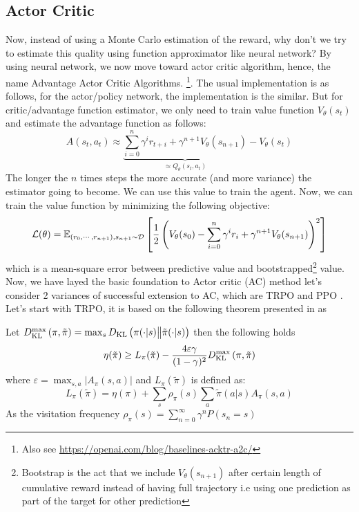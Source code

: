 \subsection{Actor Critic}
\label{sec:chap2-ator-critic}
Now, instead of using a Monte Carlo estimation of the reward, why don't we try to estimate this quality using function approximator like neural network? By using neural network, we now move toward actor critic algorithm, hence, the name Advantage Actor Critic Algorithms. \cite{mnih2016asynchronous}\footnote{Also see  \url{https://openai.com/blog/baselines-acktr-a2c/}}. The usual implementation is as follows, for the actor/policy network, the implementation is the similar. But for critic/advantage function estimator, we only need to train value function $V_\theta(s_t)$  and estimate the advantage function as follows:
\begin{equation}
    A(s_t, a_t) \approx \underbrace{\sum^n_{i=0} \gamma^i r_{t + i} + \gamma^{n+1} V_\theta(s_{n+1})}_{\approx Q_\theta(s_t, a_t)} - V_\theta(s_t)
\end{equation}
The longer the $n$ times steps the more accurate (and more variance) the estimator going to become. We can use this value to train the agent. Now, we can train the value function by minimizing the following objective:
\begin{equation}
\label{eqn:chap2-ac-critic-loss}
    \mathcal{L}(\theta) = \mathbb{E}_{(r_0, \cdots, r_{n+1}), s_{n+1} \sim \mathcal{D}}\left[ \frac{1}{2}\left( V_\theta(s_0) - \sum^n_{i=0} \gamma^i r_i + \gamma^{n+1}V_\theta(s_{n+1}) \right)^2 \right]
\end{equation}
which is a mean-square error between predictive value and bootstrapped\footnote{Bootstrap is the act that we include $V_\theta(s_{n+1})$ after certain length of cumulative reward instead of having full trajectory i.e using one prediction as part of the target for other prediction} value. Now, we have layed the basic foundation to Actor critic (AC) method let's consider 2 variances of successful extension to AC, which are TRPO \cite{schulman2015trust} and PPO \cite{schulman2017proximal}. Let's start with TRPO, it is based on the following theorem presented in \cite{schulman2015trust} as 
\begin{theorem}
Let $D_{\mathrm{KL}}^{\max}\left( \pi, \tilde{\pi} \right) = \max_s D_{\mathrm{KL}}\left( \pi(\cdot | s) \big\| \tilde{\pi}(\cdot | s) \right)$  then the following holds
\begin{equation}
    \eta(\tilde{\pi}) \ge L_\pi(\tilde{\pi}) - \frac{4\varepsilon \gamma}{(1-\gamma)^2}D_{\mathrm{KL}}^{\max}\left( \pi, \tilde{\pi} \right)
\end{equation}
where $\varepsilon = \max_{s, a}|A_\pi(s, a)|$ and $L_\pi(\tilde{\pi})$ is defined as:
\begin{equation}
    L_\pi(\tilde{\pi}) = \eta(\pi) + \sum_s \rho_\pi(s) \sum_a \tilde{\pi}(a | s) A_\pi(s, a)
\end{equation}
As the visitation frequency $\rho_\pi(s) = \sum^\infty_{n=0} \gamma^n P(s_n = s)$
\end{theorem}
